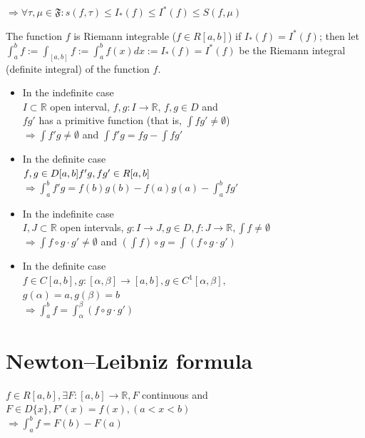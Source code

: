 \documentclass[margin=0px]{article}
\newcommand{\R}{\mathbb{R}}
\begin{document}
\begin{description}
        $ \Rightarrow \forall \tau,\mu \in \mathfrak{F} : s(f, \tau) \leq I_*(f) \leq I^*(f) \leq S(f,\mu) $

        The function $ f $ is Riemann integrable ($ f \in R[a,b] $) if $ I_*(f) = I^*(f) $; then let \\
        $ \int_{a}^{b}f := \int_{[a,b]}f := \int_{a}^{b}f(x) dx := I_*(f) = I^*(f) $ be the Riemann integral (definite integral) of the function $f$.

    \item[Integration by parts] \hfill
        \begin{itemize}
            \item In the indefinite case \hfill \\
                  $ I \subset \R $ open interval, $ f,g : I \rightarrow \R $, $f,g \in D$ and \\
                  $ fg'$ has a primitive function (that is, $ \int fg' \neq \emptyset $)\\
                  $ \Rightarrow \int f'g \neq \emptyset $ and $ \int f'g = fg - \int fg' $
            \item In the definite case \hfill \\
                  $ f,g \in D[a,b] \\ f'g, f g' \in R[a,b] $ \\
                  $ \Rightarrow \int_a^b f'g = f(b)g(b) - f(a)g(a) - \int_a^b fg'$
        \end{itemize}

    \item[Integration by substitution] \hfill
        \begin{itemize}
            \item In the indefinite case \hfill \\
                  $ I,J \subset \R $ open intervals, $g: I \rightarrow J,  g \in D, f:J \rightarrow \R, \int f \neq \emptyset $ \\
                  $\Rightarrow \int f \circ g\cdot g' \neq \emptyset $ and $ (\int f) \circ g = \int(f\circ g\cdot g') $
            \item In the definite case \hfill \\
                  $ f \in C[a,b], g : [\alpha,\beta] \rightarrow [a,b], g \in C^1[\alpha,\beta],$\\
                  $g(\alpha) = a, g(\beta) = b $ \\
                  $ \Rightarrow \int_a^b f = \int_{\alpha}^{\beta} (f\circ g \cdot g')$
        \end{itemize}
\end{description}
\section{Newton--Leibniz formula}

$ f \in R[a,b], \exists F:[a,b] \rightarrow \R, F $ continuous and $ F \in D\{x\}, F'(x) = f(x), (a < x < b) $ \\
$ \Rightarrow \int_a^b f = F(b) - F(a) $
\end{document}
